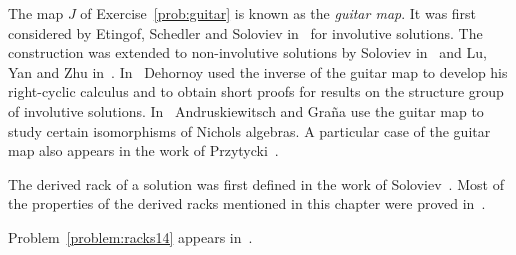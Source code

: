 The map $J$ of Exercise~\ref{prob:guitar} is known as the \emph{guitar map}. 
It was first considered by Etingof, Schedler and
Soloviev in~\cite{MR1722951} for involutive solutions. The construction was extended to non-involutive solutions
by Soloviev in~\cite{MR1809284} and Lu, Yan and Zhu in~\cite{MR1769723}. In~\cite{MR3374524} Dehornoy
used the inverse of the guitar map to develop his right-cyclic calculus and to
obtain short proofs for results on the structure group of involutive solutions. 
In~\cite{MR1994219} Andruskiewitsch and Graña use the guitar map to study certain isomorphisms of Nichols algebras. 
A particular case of the guitar map also appears in the work of Przytycki~\cite{MR2906433}. 

The derived rack of a solution was first defined in the work of Soloviev~\cite{MR1809284}. Most of the properties
of the derived racks mentioned in this chapter were proved in~\cite{MR3974961}.

Problem~\ref{problem:racks14} appears in~\cite{MR3957904}. 

